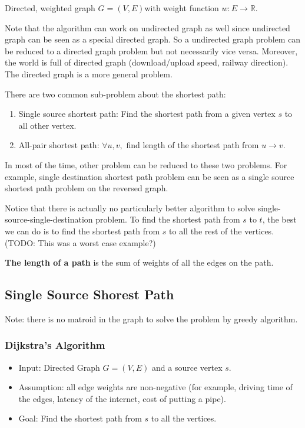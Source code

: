  Directed, weighted graph $G = (V, E)$with weight function $w: E \rightarrow \mathbb{R}$.
 
 Note that the algorithm can work on undirected graph as well since undirected graph can be seen as a special directed graph. So a undirected graph problem can be reduced to a directed graph problem but not necessarily vice versa. Moreover, the world is full of directed graph (download/upload speed, railway direction). The directed graph is a more general problem. 

There are two common sub-problem about the shortest path:
\begin{enumerate}
	\item Single source shortest path: Find the shortest path from a given vertex $s$ to all other vertex.
	\item All-pair shortest path: $\forall u, v,$ find length of the shortest path from $u \rightarrow v$.
\end{enumerate}
In most of the time, other problem can be reduced to these two problems. For example, single destination shortest path problem can be seen as a single source shortest path problem on the reversed graph.

Notice that there is actually no particularly better algorithm to solve single-source-single-destination problem. To find the shortest path from $s$ to $t$, the best we can do is to find the shortest path from $s$ to all the rest of the vertices. (TODO: This was a worst case example?)

\begin{definition}
	\textbf{The length of a path} is the sum of weights of all the edges on the path.
\end{definition}

 \subsection{Single Source Shorest Path}
Note: there is no matroid in the graph to solve the problem by greedy algorithm.

\subsubsection{Dijkstra's Algorithm}
\begin{itemize}
	\item Input: Directed Graph $G = (V, E)$ and a source vertex $s$.
	\item Assumption: all edge weights are non-negative (for example, driving time of the edges, latency of the internet, cost of putting a pipe).
	\item Goal: Find the shortest path from $s$ to all the vertices.
\end{itemize}

